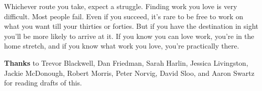 Whichever route you take, expect a struggle. Finding work you love is
very difficult. Most people fail. Even if you succeed, it's rare to be
free to work on what you want till your thirties or forties. But if you
have the destination in sight you'll be more likely to arrive at it. If
you know you can love work, you're in the home stretch, and if you know
what work you love, you're practically there.


\textbf{Thanks} to Trevor Blackwell, Dan Friedman, Sarah Harlin, Jessica
Livingston, Jackie McDonough, Robert Morris, Peter Norvig, David Sloo,
and Aaron Swartz for reading drafts of this.